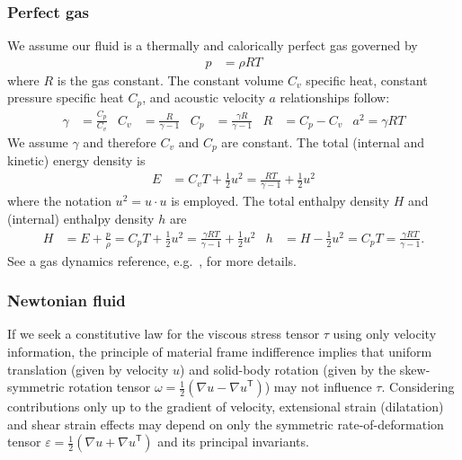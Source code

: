 \documentclass[letterpaper,11pt,nointlimits,reqno]{amsart}
\newcommand{\trans}[1]{{#1}^{\ensuremath{\mathsf{T}}}}
\begin{document}
\subsubsection{Perfect gas}

We assume our fluid is a thermally and calorically perfect gas governed by
\begin{align}
  \label{eq:perfectgaseos}
  p &= \rho{} R T
\end{align}
where $R$ is the gas constant. The constant volume $C_{v}$ specific heat,
constant pressure specific heat $C_{p}$, and acoustic velocity $a$
relationships follow:
\begin{align}
  \label{eq:perfectgasrelations}
  \gamma &= \frac{C_{p}}{C_{v}}
  &
  C_{v} &= \frac{R}{\gamma - 1}
  &
  C_{p} &= \frac{\gamma{}R}{\gamma-1}
  &
  R &= C_{p} - C_{v}
  &
  a^{2} = \gamma{}RT
\end{align}
We assume $\gamma$ and therefore $C_{v}$ and $C_{p}$ are constant.
The total (internal and kinetic) energy density is
\begin{align}
  \label{eq:perfectgastotalenergy}
  E &= C_{v} T + \frac{1}{2}u^{2}
     = \frac{RT}{\gamma-1} + \frac{1}{2}u^{2}
\end{align}
where the notation $u^2 = u\cdot{}u$ is employed.
The total enthalpy density $H$ and (internal) enthalpy density $h$ are
\begin{align}
  \label{eq:perfectgasenthalpy}
  H &= E + \frac{p}{\rho}
     = C_{p} T + \frac{1}{2}u^{2}
     = \frac{\gamma{}RT}{\gamma-1} + \frac{1}{2}u^{2}
  &
  h &= H - \frac{1}{2}u^{2}
     = C_{p} T
     = \frac{\gamma{}RT}{\gamma-1}
  .
\end{align}
See a gas dynamics reference, e.g.~\cite{LiepmannRoshko2002}, for more details.

\subsubsection{Newtonian fluid}
\label{sec:newtonianfluid}

If we seek a constitutive law for the viscous stress tensor $\tau$
using only velocity information, the principle of material frame
indifference implies that uniform translation (given by velocity $u$)
and solid-body rotation (given by the skew-symmetric rotation tensor
$\omega=\frac{1}{2}\left( \nabla{}u-\trans{\nabla{}u} \right)$)
may not influence $\tau$.  Considering contributions only up to the
gradient of velocity, extensional strain (dilatation) and shear strain
effects may depend on only the symmetric rate-of-deformation tensor
$\varepsilon=\frac{1}{2}\left( \nabla{}u+\trans{\nabla{}u}\right)$
and its principal invariants.
\end{document}
